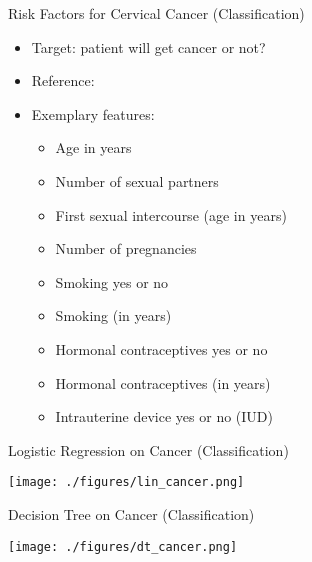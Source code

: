 \documentclass[aspectratio=169]{../latex_main/tntbeamer}  %
\begin{document}
    \begin{frame}{Risk Factors for Cervical Cancer (Classification)}
        
        \begin{itemize}
            \item Target: patient will get cancer or not?
            \item Reference: 
            \item Exemplary features:
            \begin{itemize}
                \item Age in years
                \item Number of sexual partners
                \item First sexual intercourse (age in years)
                \item Number of pregnancies
                \item Smoking yes or no
                \item Smoking (in years)
                \item Hormonal contraceptives yes or no
                \item Hormonal contraceptives (in years)
                \item Intrauterine device yes or no (IUD)
            \end{itemize}
        \end{itemize}
        
    \end{frame}
	
	\begin{frame}{Logistic Regression on  Cancer (Classification)}
        
        \centering
        \texttt{[image: ./figures/lin\_cancer.png]}     
        
    \end{frame}
	
	\begin{frame}{Decision Tree on  Cancer (Classification)}
        
        \centering
        \texttt{[image: ./figures/dt\_cancer.png]}     
    \end{frame}
	
\end{document}
